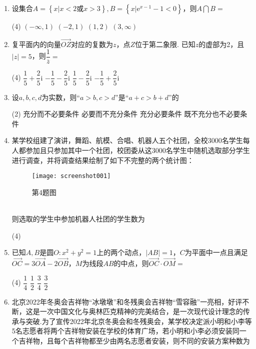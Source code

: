 \documentclass[11pt]{article}
\begin{document}
\begin{enumerate}
	\item 设集合$ A=\left \{ x|x<2\text{或}x>3\right \},  B=\left \{ x|\mathrm{e}^{x-1}-1<0 \right \} $，则$ A\bigcap B= $
	\begin{tasks}(4)
		\task $ \left ( -\infty ,1 \right )  $
		\task $ \left ( -2,1 \right )  $
		\task $ \left ( 1,2 \right )  $
		\task $ \left ( 3,\infty \right )  $
	\end{tasks}
	\item 复平面内的向量$ \overrightarrow{OZ}  $对应的复数为$ z $，点$ Z $位于第二象限. 已知$ z $的虚部为2，且$ \left | z \right | =5 $，则$ \dfrac{1}{\overline{z} } = $
	\begin{tasks}(4)
		\task $ \dfrac{1}{5}+\dfrac{2}{5}\mathrm{i} $
		\task $ -\dfrac{1}{5}-\dfrac{2}{5}\mathrm{i} $
		\task $ \dfrac{1}{5}-\dfrac{2}{5}\mathrm{i} $
		\task $ -\dfrac{1}{5}+\dfrac{2}{5}\mathrm{i} $
	\end{tasks}
	\item 设$ a,b,c,d $为实数，则“$ a>b,c>d $”是“$ a+c>b+d $”的
	\begin{tasks}(2)
		\task 充分而不必要条件
		\task 必要而不充分条件
		\task 充分必要条件
		\task 既不充分也不必要条件
	\end{tasks}
	\item 某学校组建了演讲，舞蹈、航模、合唱、机器人五个社团，全校3000名学生每人都参加且只参加其中一个社团，校团委从这3000名学生中随机选取部分学生进行调查，并将调查结果绘制了如下不完整的两个统计图：
	\begin{figure}[htbp]
		\centering
		\texttt{[image: screenshot001]}
		\caption{\heiti 第4题图}
		\label{fig:screenshot001}
	\end{figure}
	\\则选取的学生中参加机器人社团的学生数为
	\begin{tasks}(4)
	\end{tasks}
	\item 已知$ A,B $是圆$ O:x^2+y^2=1 $上的两个动点，$ \left | AB \right |=1  $，$ C $为平面中一点且满足$ \overrightarrow{OC}=3 \overrightarrow{OA}-2\overrightarrow{OB} $，$ M $为线段$ AB $的中点，则$ \overrightarrow{OC}\cdot\overrightarrow{OM}= $
	\begin{tasks}(4)
		\task $ \dfrac{1}{4} $
		\task $ \dfrac{1}{2} $
		\task $ \dfrac{3}{4} $
		\task $ \dfrac{3}{2} $
	\end{tasks}
	\item 北京2022年冬奥会吉祥物“冰墩墩”和冬残奥会吉祥物“雪容融”一亮相，好评不断，这是一次中国文化与奥林匹克精神的完美结合，是一次现代设计理念的传承与突破.为了宣传2022年北京冬奥会和冬残奥会，某学校决定派小明和小李等5名志愿者将两个吉祥物安装在学校的体育广场，若小明和小李必须安装同一个吉祥物，且每个吉祥物都至少由两名志愿者安装，则不同的安装方案种数为

\end{enumerate}
\end{document}

